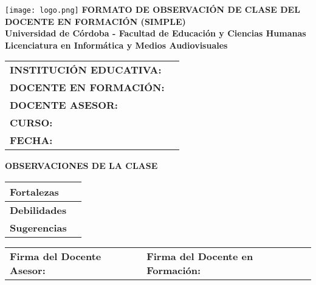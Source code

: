 \documentclass[a4paper,12pt]{article}
\begin{document}
\begin{center}
    \vspace*{1cm}
    \texttt{[image: logo.png]} %
    \vspace{0.5cm}
    \textbf{\Large FORMATO DE OBSERVACIÓN DE CLASE DEL DOCENTE EN FORMACIÓN (SIMPLE)} \\
    \vspace{0.5cm}
    \textbf{Universidad de Córdoba - Facultad de Educación y Ciencias Humanas} \\
    \textbf{Licenciatura en Informática y Medios Audiovisuales}
\end{center}

\vspace{0.5cm}
\begin{tabularx}{\textwidth}{@{}p{5cm}X@{}}
    \toprule
    \textbf{INSTITUCIÓN EDUCATIVA:} & \hrulefill \\
    \textbf{DOCENTE EN FORMACIÓN:} & \hrulefill \\
    \textbf{DOCENTE ASESOR:} & \hrulefill \\
    \textbf{CURSO:} & \hrulefill \\
    \textbf{FECHA:} & \hrulefill \\
    \bottomrule
\end{tabularx}

\vspace{0.5cm}
\noindent
\textbf{OBSERVACIONES DE LA CLASE}
\begin{table}[h]
    \centering
    \scriptsize
    \begin{tabularx}{\textwidth}{|p{3cm}|X|}
        \hline
        \textbf{Fortalezas} & \vspace{2cm} \\ \hline
        \textbf{Debilidades} & \vspace{2cm} \\ \hline
        \textbf{Sugerencias} & \vspace{2cm} \\ \hline
    \end{tabularx}
\end{table}

\vspace{0.5cm}
\begin{center}
    \begin{tabular}{p{7cm}p{7cm}}
        \hline
        \textbf{Firma del Docente Asesor:} \hrulefill & \textbf{Firma del Docente en Formación:} \hrulefill \\
    \end{tabular}
\end{center}
\end{document}
